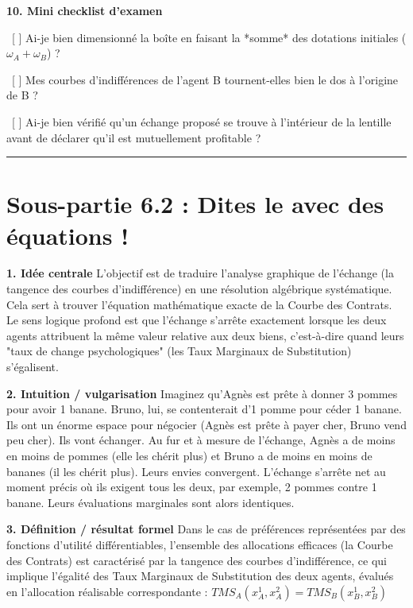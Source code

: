\documentclass[11pt, a4paper]{report}
\begin{document}
\textbf{10. Mini checklist d'examen}
\par \textbullet\ [ ] Ai-je bien dimensionné la boîte en faisant la *somme* des dotations initiales ($\omega_A + \omega_B$) ?
\par \textbullet\ [ ] Mes courbes d'indifférences de l'agent B tournent-elles bien le dos à l'origine de B ?
\par \textbullet\ [ ] Ai-je bien vérifié qu'un échange proposé se trouve à l'intérieur de la lentille avant de déclarer qu'il est mutuellement profitable ?

\vspace{1cm}\hrule\vspace{1cm}

\section{Sous-partie 6.2 : Dites le avec des équations !}

\textbf{1. Idée centrale}
L'objectif est de traduire l'analyse graphique de l'échange (la tangence des courbes d'indifférence) en une résolution algébrique systématique. Cela sert à trouver l'équation mathématique exacte de la Courbe des Contrats. Le sens logique profond est que l'échange s'arrête exactement lorsque les deux agents attribuent la même valeur relative aux deux biens, c'est-à-dire quand leurs "taux de change psychologiques" (les Taux Marginaux de Substitution) s'égalisent.

\textbf{2. Intuition / vulgarisation}
Imaginez qu'Agnès est prête à donner 3 pommes pour avoir 1 banane. Bruno, lui, se contenterait d'1 pomme pour céder 1 banane. Ils ont un énorme espace pour négocier (Agnès est prête à payer cher, Bruno vend peu cher). Ils vont échanger. Au fur et à mesure de l'échange, Agnès a de moins en moins de pommes (elle les chérit plus) et Bruno a de moins en moins de bananes (il les chérit plus). Leurs envies convergent. L'échange s'arrête net au moment précis où ils exigent tous les deux, par exemple, 2 pommes contre 1 banane. Leurs évaluations marginales sont alors identiques.

\textbf{3. Définition / résultat formel}
Dans le cas de préférences représentées par des fonctions d'utilité différentiables, l'ensemble des allocations efficaces (la Courbe des Contrats) est caractérisé par la tangence des courbes d'indifférence, ce qui implique l'égalité des Taux Marginaux de Substitution des deux agents, évalués en l'allocation réalisable correspondante :
$TMS_A(x_A^1, x_A^2) = TMS_B(x_B^1, x_B^2)$
\end{document}
